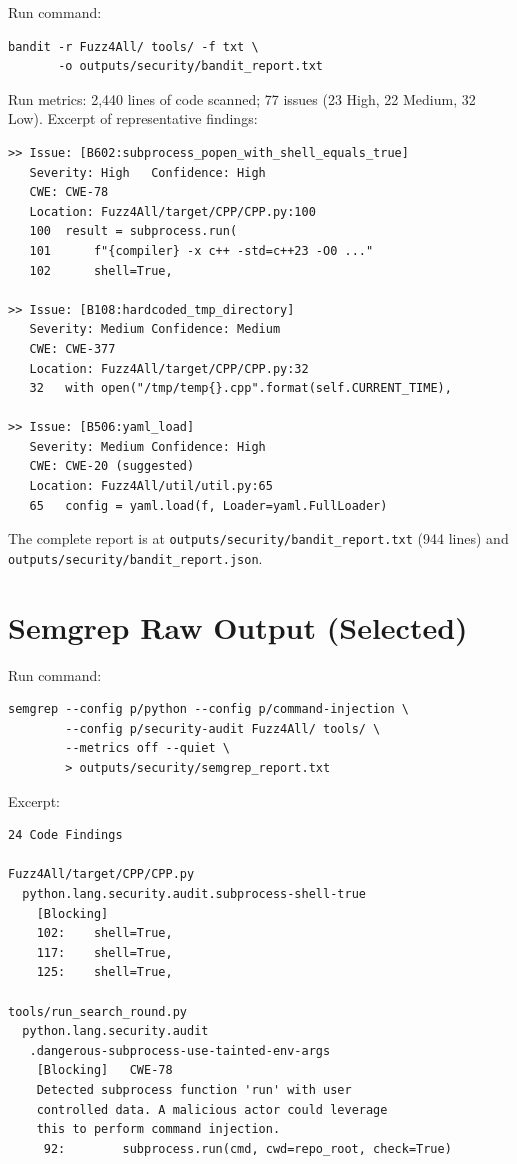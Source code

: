 \documentclass[conference]{IEEEtran}
\begin{document}
Run command:
\begin{lstlisting}[style=sh]
bandit -r Fuzz4All/ tools/ -f txt \
       -o outputs/security/bandit_report.txt
\end{lstlisting}

Run metrics: 2{,}440 lines of code scanned; 77 issues
(23 High, 22 Medium, 32 Low). Excerpt of representative findings:

\begin{lstlisting}[style=plain]
>> Issue: [B602:subprocess_popen_with_shell_equals_true]
   Severity: High   Confidence: High
   CWE: CWE-78
   Location: Fuzz4All/target/CPP/CPP.py:100
   100  result = subprocess.run(
   101      f"{compiler} -x c++ -std=c++23 -O0 ..."
   102      shell=True,

>> Issue: [B108:hardcoded_tmp_directory]
   Severity: Medium Confidence: Medium
   CWE: CWE-377
   Location: Fuzz4All/target/CPP/CPP.py:32
   32   with open("/tmp/temp{}.cpp".format(self.CURRENT_TIME),

>> Issue: [B506:yaml_load]
   Severity: Medium Confidence: High
   CWE: CWE-20 (suggested)
   Location: Fuzz4All/util/util.py:65
   65   config = yaml.load(f, Loader=yaml.FullLoader)
\end{lstlisting}

The complete report is at
\texttt{outputs/security/bandit\_report.txt} (944 lines) and
\texttt{outputs/security/bandit\_report.json}.

\section{Semgrep Raw Output (Selected)}
\label{app:semgrep}

Run command:
\begin{lstlisting}[style=sh]
semgrep --config p/python --config p/command-injection \
        --config p/security-audit Fuzz4All/ tools/ \
        --metrics off --quiet \
        > outputs/security/semgrep_report.txt
\end{lstlisting}

Excerpt:

\begin{lstlisting}[style=plain]
24 Code Findings

Fuzz4All/target/CPP/CPP.py
  python.lang.security.audit.subprocess-shell-true
    [Blocking]
    102:    shell=True,
    117:    shell=True,
    125:    shell=True,

tools/run_search_round.py
  python.lang.security.audit
   .dangerous-subprocess-use-tainted-env-args
    [Blocking]   CWE-78
    Detected subprocess function 'run' with user
    controlled data. A malicious actor could leverage
    this to perform command injection.
     92:        subprocess.run(cmd, cwd=repo_root, check=True)
\end{lstlisting}
\end{document}

